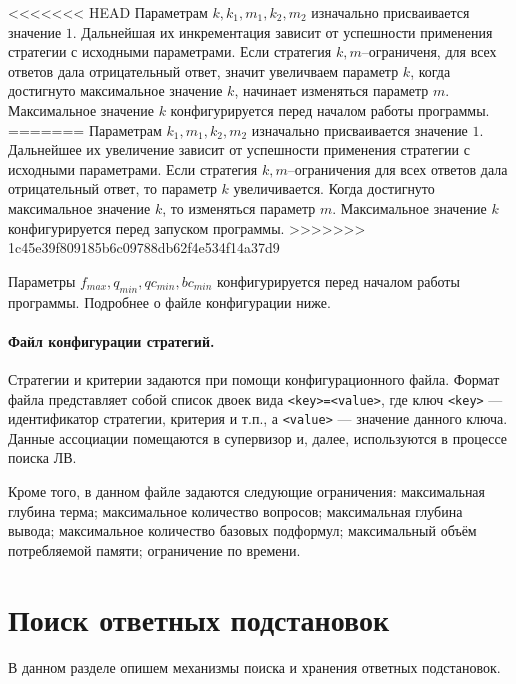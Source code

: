<<<<<<< HEAD
Параметрам $k, k_1, m_1, k_2, m_2$ изначально присваивается значение $1$. Дальнейшая их инкрементация зависит от успешности применения стратегии с исходными параметрами. Если стратегия $k,m$--ограниченя, для всех ответов дала отрицательный ответ, значит увеличваем параметр $k$, когда достигнуто максимальное значение $k$, начинает изменяться параметр $m$. Максимальное значение $k$ конфигурируется перед началом работы программы.
=======
Параметрам $k_1, m_1, k_2, m_2$ изначально присваивается значение $1$. Дальнейшее их увеличение зависит от успешности применения стратегии с исходными параметрами. Если стратегия $k,m$--ограничения для всех ответов дала отрицательный ответ, то параметр $k$ увеличивается. Когда достигнуто максимальное значение $k$, то изменяться параметр $m$. Максимальное значение $k$ конфигурируется перед запуском программы.
>>>>>>> 1c45e39f809185b6c09788db62f4e534f14a37d9

Параметры $f_{max}, q_{min}, qc_{min}, bc_{min}$ конфигурируется перед началом работы программы. Подробнее о файле конфигурации ниже.

\paragraph{Файл конфигурации стратегий.}
Стратегии и критерии задаются при помощи конфигурационного файла. Формат файла представляет собой список двоек вида \texttt{<key>=<value>}, где ключ \texttt{<key>} --- идентификатор стратегии, критерия и т.п., а \texttt{<value>} --- значение данного ключа. Данные ассоциации помещаются в супервизор и, далее, используются в процессе поиска ЛВ.

Кроме того, в данном файле задаются следующие ограничения: максимальная глубина терма; максимальное количество вопросов; максимальная глубина вывода; максимальное количество базовых подформул; максимальный объём потребляемой памяти; ограничение по времени.




\section{Поиск ответных подстановок}
В данном разделе опишем механизмы поиска и хранения ответных подстановок.


